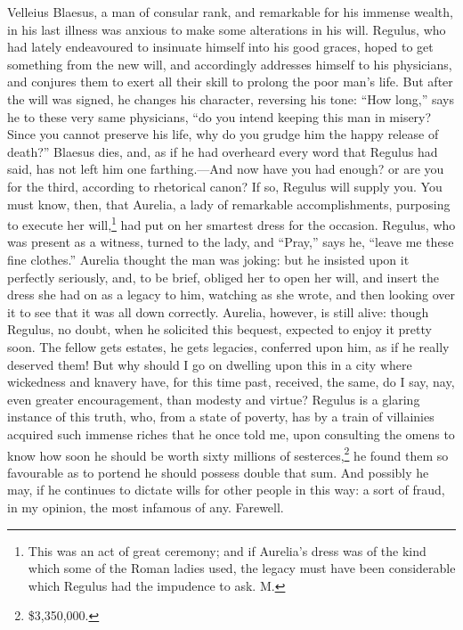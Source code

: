 Velleius Blaesus, a man of consular rank, and remarkable for his immense
wealth, in his last illness was anxious to make some alterations in his
will. Regulus, who had lately endeavoured to insinuate himself into his
good graces, hoped to get something from the new will, and accordingly
addresses himself to his physicians, and conjures them to exert all their
skill to prolong the poor man's life. But after the will was signed, he
changes his character, reversing his tone: ``How long,'' says he to these
very same physicians, ``do you intend keeping this man in misery? Since you
cannot preserve his life, why do you grudge him the happy release of
death?'' Blaesus dies, and, as if he had overheard every word that Regulus
had said, has not left him one farthing.—And now have you had
enough? or are you for the third, according to rhetorical canon? If so,
Regulus will supply you. You must know, then, that Aurelia, a lady of
remarkable accomplishments, purposing to execute her will,\footnote{This was an act of great
ceremony; and if Aurelia's dress was of the kind which some of the Roman
ladies used, the legacy must have been considerable which Regulus had the
impudence to ask. M.} had
put on her smartest dress for the occasion. Regulus, who was present as a
witness, turned to the lady, and ``Pray,'' says he, ``leave me these fine
clothes.'' Aurelia thought the man was joking: but he insisted upon it
perfectly seriously, and, to be brief, obliged her to open her will, and
insert the dress she had on as a legacy to him, watching as she wrote, and
then looking over it to see that it was all down correctly. Aurelia,
however, is still alive: though Regulus, no doubt, when he solicited this
bequest, expected to enjoy it pretty soon. The fellow gets estates, he
gets legacies, conferred upon him, as if he really deserved them! But why
should I go on dwelling upon this in a city where wickedness and knavery
have, for this time past, received, the same, do I say, nay, even greater
encouragement, than modesty and virtue? Regulus is a glaring instance of
this truth, who, from a state of poverty, has by a train of villainies
acquired such immense riches that he once told me, upon consulting the
omens to know how soon he should be worth sixty millions of sesterces,\footnote{\$3,350,000.} he
found them so favourable as to portend he should possess double that sum.
And possibly he may, if he continues to dictate wills for other people in
this way: a sort of fraud, in my opinion, the most infamous of any.
Farewell.


